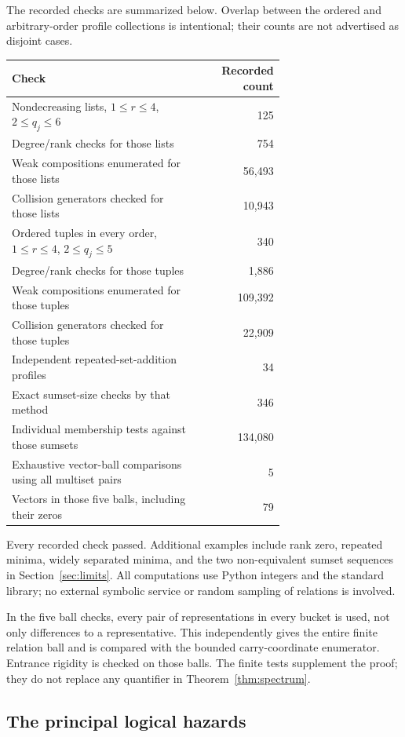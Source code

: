 \documentclass[11pt]{article}
\numberwithin{equation}{section}
\theoremstyle{definition}
\theoremstyle{remark}\newtheorem{remark}[theorem]{Remark}
\begin{document}
The recorded checks are summarized below.  Overlap between the ordered and
arbitrary-order profile collections is intentional; their counts are not
advertised as disjoint cases.
\begin{center}
\begin{tabular}{@{}p{0.69\linewidth}r@{}}
\toprule
\textbf{Check} & \textbf{Recorded count}\\
\midrule
Nondecreasing lists, $1\le r\le4$, $2\le q_j\le6$ & 125\\
Degree/rank checks for those lists & 754\\
Weak compositions enumerated for those lists & 56,493\\
Collision generators checked for those lists & 10,943\\
Ordered tuples in every order, $1\le r\le4$, $2\le q_j\le5$ & 340\\
Degree/rank checks for those tuples & 1,886\\
Weak compositions enumerated for those tuples & 109,392\\
Collision generators checked for those tuples & 22,909\\
Independent repeated-set-addition profiles & 34\\
Exact sumset-size checks by that method & 346\\
Individual membership tests against those sumsets & 134,080\\
Exhaustive vector-ball comparisons using all multiset pairs & 5\\
Vectors in those five balls, including their zeros & 79\\
\bottomrule
\end{tabular}
\end{center}
Every recorded check passed.  Additional examples include rank zero,
repeated minima, widely separated minima, and the two non-equivalent
sumset sequences in Section~\ref{sec:limits}.  All computations use Python
integers and the standard library; no external symbolic service or random
sampling of relations is involved.

In the five ball checks, every pair of representations in every bucket is
used, not only differences to a representative.  This independently gives
the entire finite relation ball and is compared with the bounded
carry-coordinate enumerator.  Entrance rigidity is checked on those balls.
The finite tests supplement the proof; they do not replace any quantifier
in Theorem~\ref{thm:spectrum}.

\subsection{The principal logical hazards}
\end{document}

